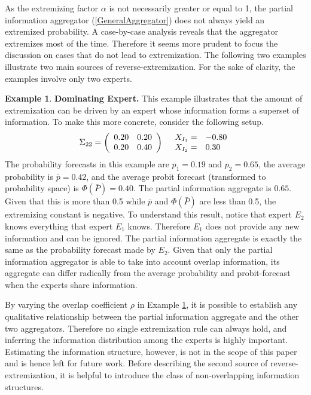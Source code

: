 \documentclass[11pt,twoside]{article}
\theoremstyle{definition}
\newtheorem{example}[theorem]{Example}
\theoremstyle{definition}
\begin{document}
As the extremizing factor $\alpha$ is not necessarily greater or equal to 1, the partial information aggregator (\ref{GeneralAggregator}) does not always yield an extremized probability. A case-by-case analysis reveals that the aggregator extremizes most of the time. Therefore it seems more prudent to focus the discussion on cases that do not lead to extremization. The following two examples illustrate two main sources of reverse-extremization. For the sake of clarity, the examples involve only two experts. 



\begin{example}
\label{Example1}
\textbf{Dominating Expert.} This example illustrates that the amount of extremization can be driven by an expert whose information forms a superset of information. To make this more concrete, consider the following setup.
\begin{align*}
\Sigma_{22} =  \left(\begin{array}{c c}
0.20 & 0.20\\
0.20 & 0.40 \\
 \end{array}\right)
  && 
  \begin{array}{l l}
X_{I_1} =& -0.80\\
X_{I_2} =& 0.30
 \end{array}
\end{align*}
The probability forecasts in this example are $p_1 = 0.19$ and $p_2 = 0.65$, the average probability is $\bar{p} = 0.42$, and the average probit forecast (transformed to probability space) is $\Phi(\bar{P}) = 0.40$. 
The partial information aggregate is $0.65$.  Given that this is more than 0.5 while $\bar{p}$ and $\Phi(\bar{P})$ are less than 0.5, the extremizing constant is negative. To understand this result, notice that expert $E_2$ knows everything that expert $E_1$ knows. Therefore $E_1$ does not provide any new information and can be ignored. The partial information aggregate is exactly the same as the probability forecast made by $E_2$. Given that only the partial information aggregator is able to take into account overlap information, its aggregate can differ radically from the average probability and probit-forecast when the experts share information.
\end{example}

By varying the overlap coefficient $\rho$ in Example \ref{Example1}, it is possible to establish any qualitative relationship between the partial information aggregate and the other two aggregators. Therefore no single extremization rule can always hold, and inferring the information distribution among the experts is highly important. Estimating the information structure, however, is not in the scope of this paper and is hence left for future work. Before describing the second source of reverse-extremization, it is helpful to introduce the class of non-overlapping information structures. 
\end{document}
